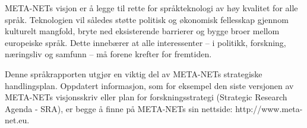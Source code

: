 \begin{multicols}{2}
META-NETs visjon er å legge til rette for språkteknologi av høy kvalitet for alle språk. Teknologien vil således støtte politisk og økonomisk fellesskap gjennom kulturelt mangfold, bryte ned eksisterende barrierer og bygge broer mellom europeiske språk. Dette innebærer at alle interessenter -- i politikk, forskning, næringsliv og samfunn -- må forene krefter for fremtiden. 

Denne språkrapporten utgjør en viktig del av META-NETs strategiske handlingsplan. Oppdatert informasjon, som for eksempel den siste versjonen av META-NETs visjonsskriv \cite{Meta1} eller plan for forskningsstrategi (Strategic Research Agenda - SRA), er begge å finne på META-NETs sin nettside: http://www.meta-net.eu.
\end{multicols}

\clearpage


